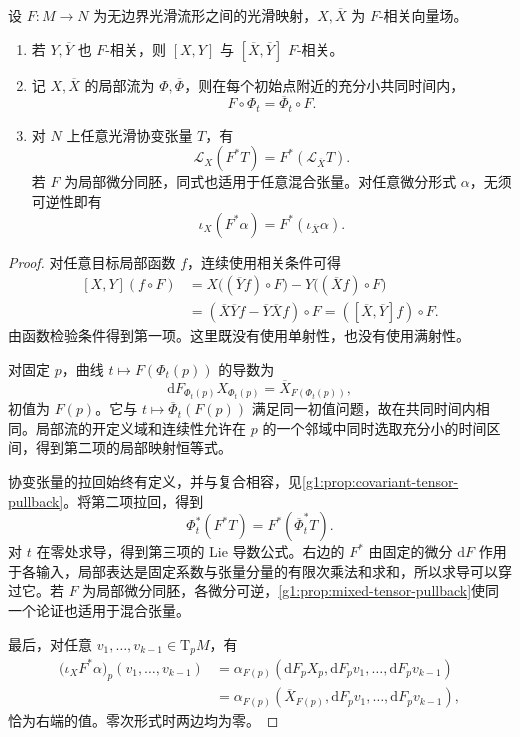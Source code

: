 \begin{proposition}
	\label{g1:prop:lie-derivative-natural}
	设 \(F:M\to N\) 为无边界光滑流形之间的光滑映射，\(X,\overline X\) 为 \(F\)-相关向量场。
	\begin{enumerate}
		\item 若 \(Y,\overline Y\) 也 \(F\)-相关，则 \([X,Y]\) 与 \([\overline X,\overline Y]\) \(F\)-相关。
		\item 记 \(X,\overline X\) 的局部流为 \(\Phi,\overline\Phi\)，则在每个初始点附近的充分小共同时间内，
		\[
			F\circ\Phi_t=\overline\Phi_t\circ F.
		\]
		\item 对 \(N\) 上任意光滑协变张量 \(T\)，有
		\[
			\mathcal L_X(F^*T)=F^*(\mathcal L_{\overline X}T).
		\]
		若 \(F\) 为局部微分同胚，同式也适用于任意混合张量。对任意微分形式 \(\alpha\)，无须可逆性即有
		\[
			\iota_X(F^*\alpha)=F^*(\iota_{\overline X}\alpha).
		\]
	\end{enumerate}
\end{proposition}
\begin{proof}
	对任意目标局部函数 \(f\)，连续使用相关条件可得
	\[
		\begin{aligned}
			[X,Y](f\circ F)
			&=X\bigl((\overline Yf)\circ F\bigr)
			-Y\bigl((\overline Xf)\circ F\bigr)\\
			&=(\overline X\overline Yf-\overline Y\overline Xf)\circ F
			=([\overline X,\overline Y]f)\circ F.
		\end{aligned}
	\]
	由函数检验条件得到第一项。这里既没有使用单射性，也没有使用满射性。

	对固定 \(p\)，曲线 \(t\mapsto F(\Phi_t(p))\) 的导数为
	\[
		\mathrm{d}F_{\Phi_t(p)}X_{\Phi_t(p)}
		=\overline X_{F(\Phi_t(p))},
	\]
	初值为 \(F(p)\)。它与 \(t\mapsto\overline\Phi_t(F(p))\) 满足同一初值问题，故在共同时间内相同。局部流的开定义域和连续性允许在 \(p\) 的一个邻域中同时选取充分小的时间区间，得到第二项的局部映射恒等式。

	协变张量的拉回始终有定义，并与复合相容，见\cref{g1:prop:covariant-tensor-pullback}。将第二项拉回，得到
	\[
		\Phi_t^*(F^*T)=F^*(\overline\Phi_t^*T).
	\]
	对 \(t\) 在零处求导，得到第三项的 Lie 导数公式。右边的 \(F^*\) 由固定的微分 \(\mathrm{d}F\) 作用于各输入，局部表达是固定系数与张量分量的有限次乘法和求和，所以求导可以穿过它。若 \(F\) 为局部微分同胚，各微分可逆，\cref{g1:prop:mixed-tensor-pullback}使同一个论证也适用于混合张量。

	最后，对任意 \(v_1,\ldots,v_{k-1}\in \mathrm{T}_pM\)，有
	\[
		\begin{aligned}
			\bigl(\iota_XF^*\alpha\bigr)_p(v_1,\ldots,v_{k-1})
			&=\alpha_{F(p)}(\mathrm{d}F_pX_p,\mathrm{d}F_pv_1,\ldots,\mathrm{d}F_pv_{k-1})\\
			&=\alpha_{F(p)}(\overline X_{F(p)},\mathrm{d}F_pv_1,\ldots,\mathrm{d}F_pv_{k-1}),
		\end{aligned}
	\]
	恰为右端的值。零次形式时两边均为零。
\end{proof}

